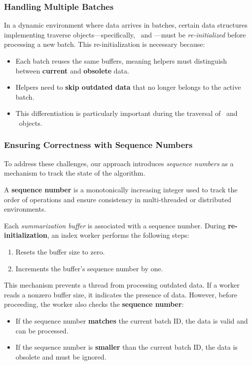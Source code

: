 {\subsubsection{Handling Multiple Batches}  

In a dynamic environment where data arrives in batches, certain data structures
implementing traverse objects—specifically, \BC\ and \PS—must be
\textit{re-initialized} before processing a new batch. This re-initialization
is necessary because:  
\begin{itemize}  
    \item Each batch reuses the same buffers, meaning helpers must distinguish
    between \textbf{current} and \textbf{obsolete} data.  
    \item Helpers need to \textbf{skip outdated data} that no longer belongs to
    the active batch.  
    \item This differentiation is particularly important during the traversal of
    \TP\ and \PS\ objects.  
\end{itemize}  

\subsubsection{Ensuring Correctness with Sequence Numbers}  

To address these challenges, our approach introduces \textit{sequence numbers}
as a mechanism to track the state of the algorithm.  

\begin{definition}  
A \textbf{sequence number} is a monotonically increasing integer used to track  
the order of operations and ensure consistency in multi-threaded or
distributed environments.  
\end{definition}  

Each \textit{summarization buffer} is associated with a sequence number.
During \textbf{re-initialization}, an index worker performs the following steps:  
\begin{enumerate}  
    \item Resets the buffer size to zero.  
    \item Increments the buffer's sequence number by one.  
\end{enumerate}  

This mechanism prevents a thread from processing outdated data. If a worker reads
a nonzero buffer size, it indicates the presence of data. However, before proceeding,
the worker also checks the \textbf{sequence number}:  
\begin{itemize}  
    \item If the sequence number \textbf{matches} the current batch ID,
     the data is valid and can be processed.  
    \item If the sequence number is \textbf{smaller} than the current batch ID,
     the data is obsolete and must be ignored.  
\end{itemize}  

}
